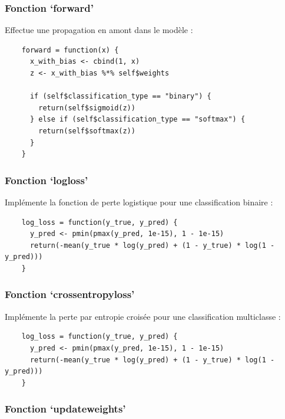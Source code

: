 \documentclass[10pt,french]{report}
\begin{document}
    \subsubsection{Fonction \enquote*{forward}}

    Effectue une propagation en amont dans le modèle :
    \begin{verbatim}
    forward = function(x) {
      x_with_bias <- cbind(1, x)
      z <- x_with_bias %*% self$weights

      if (self$classification_type == "binary") {
        return(self$sigmoid(z))
      } else if (self$classification_type == "softmax") {
        return(self$softmax(z))
      }
    }
    \end{verbatim}

    \subsubsection{Fonction \enquote*{log\textunderscore loss}}

    Implémente la fonction de perte logistique pour une classification binaire :
    \begin{verbatim}
    log_loss = function(y_true, y_pred) {
      y_pred <- pmin(pmax(y_pred, 1e-15), 1 - 1e-15)
      return(-mean(y_true * log(y_pred) + (1 - y_true) * log(1 - y_pred)))
    }
    \end{verbatim}

    \subsubsection{Fonction \enquote*{cross\textunderscore  entropy\textunderscore loss}}

    Implémente la perte par entropie croisée pour une classification multiclasse :
    \begin{verbatim}
    log_loss = function(y_true, y_pred) {
      y_pred <- pmin(pmax(y_pred, 1e-15), 1 - 1e-15)
      return(-mean(y_true * log(y_pred) + (1 - y_true) * log(1 - y_pred)))
    }
    \end{verbatim}

    \subsubsection{Fonction \enquote*{update\textunderscore  weights}}
\end{document}
